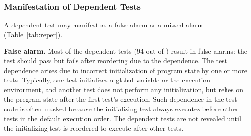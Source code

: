 





\subsubsection{Manifestation of Dependent Tests}
\label{sec:repercussion}



A dependent test may manifest as a false alarm or a missed alarm
(Table~\ref{tab:reper}).

\vspace{1mm}

\noindent \textbf{False alarm.} Most of
the dependent tests (94 out of \dtnum) 
result in false alarms:
the test should pass but fails after reordering due to the dependence.
The test dependence arises due to incorrect initialization
of program state by one
or more tests. Typically, one test initializes
a global variable or the execution environment, and another
test does not perform any initialization, but
relies on the program state after the first test's execution.
Such dependence in the test code is often masked because
the initializing test always executes before other tests in the
default execution order. The dependent tests are not revealed
until the initializing test is reordered to execute
after other tests. 


